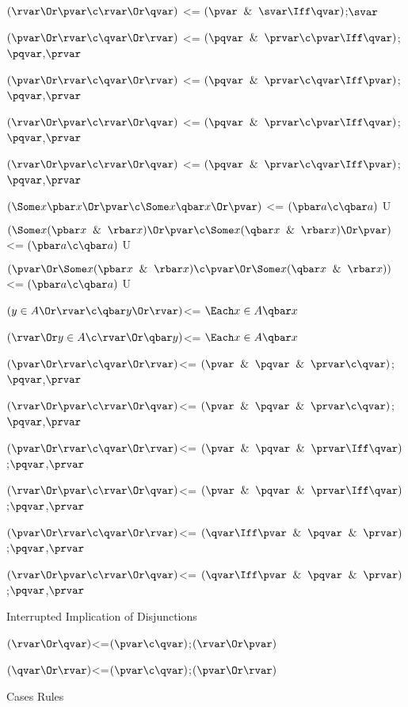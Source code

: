 $(\rvar \Or \pvar   \c \rvar \Or \qvar  )$ <= $(\pvar \And \svar\Iff \qvar)$;$\svar$

$(\pvar \Or \rvar \c \qvar \Or \rvar)$ <= $(\pqvar \And \prvar \c\pvar \Iff \qvar)$;$\pqvar$,$\prvar$

$(\pvar \Or \rvar \c \qvar \Or \rvar)$ <= $(\pqvar\And\prvar\c\qvar \Iff\pvar)$;$\pqvar$,$\prvar$

$(\rvar \Or \pvar \c \rvar \Or \qvar)$ <= $(\pqvar\And\prvar\c\pvar \Iff\qvar)$;$\pqvar$,$\prvar$

$(\rvar \Or \pvar \c \rvar \Or \qvar)$ <= $(\pqvar\And\prvar\c\qvar \Iff\pvar)$;$\pqvar$,$\prvar$

$(\Some x \pbar x \Or \pvar \c \Some x \qbar x \Or \pvar)$ <= $(\pbar a\c\qbar a)$ U 

$(\Some x (\pbar x \And \rbar x) \Or \pvar \c \Some x (\qbar x \And \rbar x)\Or \pvar)$<= $(\pbar a \c \qbar a)$ U

$(\pvar \Or \Some x (\pbar x \And \rbar x) \c \pvar \Or \Some x (\qbar x \And \rbar x))$<= $(\pbar a \c \qbar a)$ U

$(y \in A \Or \rvar \c \qbar y \Or \rvar)$<= $\Each x \in A \qbar x$

$(\rvar \Or y \in A \c \rvar \Or \qbar y )$<= $\Each x \in A \qbar x$

$(\pvar \Or \rvar \c \qvar \Or \rvar)$<= $(\pvar \And \pqvar \And \prvar \c \qvar)$;$\pqvar$,$\prvar$

$(\rvar \Or \pvar \c \rvar \Or \qvar)$<= $(\pvar \And \pqvar \And \prvar \c \qvar)$;$\pqvar$,$\prvar$

$(\pvar \Or \rvar \c \qvar \Or \rvar)$<= $(\pvar \And \pqvar \And \prvar \Iff \qvar)$;$\pqvar$,$\prvar$

$(\rvar \Or \pvar \c \rvar \Or \qvar)$<= $(\pvar \And \pqvar \And \prvar \Iff \qvar)$;$\pqvar$,$\prvar$

$(\pvar \Or \rvar \c \qvar \Or \rvar)$<= $(\qvar \Iff \pvar \And \pqvar \And \prvar )$;$\pqvar$,$\prvar$

$(\rvar \Or \pvar \c \rvar \Or \qvar)$<= $(\qvar \Iff \pvar \And \pqvar \And \prvar )$;$\pqvar$,$\prvar$
\lineb

Interrupted Implication of Disjunctions
\lineb

$(\rvar \Or \qvar)$<=$(\pvar \c \qvar)$;$(\rvar \Or \pvar)$

$(\qvar \Or \rvar)$<=$(\pvar \c \qvar)$;$(\pvar \Or \rvar)$

\lineb

Cases Rules
\lineb


